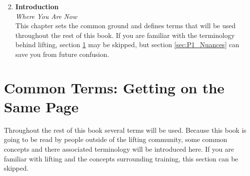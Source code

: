\begin{enumerate}
    \setcounter{enumi}{1}
    \item \textbf{Introduction} \\ \textit{Where You Are Now} \\
    		This chapter sets the common ground and defines terms that will be used throughout the rest of this book. If you are familiar with the terminology behind lifting, section \ref{sec:P1_CommonTermsSection} may be skipped, but section \ref{sec:P1_Nuances} can save you from future confusion.
%    		
%        
%        
\end{enumerate}

\section{Common Terms: Getting on the Same Page}
\label{sec:P1_CommonTermsSection}

Throughout the rest of this book several terms will be used. Because this book is going to be read by people outside of the lifting community, some common concepts and there associated terminology will be introduced here. If you are familiar with lifting and the concepts surrounding training, this section can be skipped.

